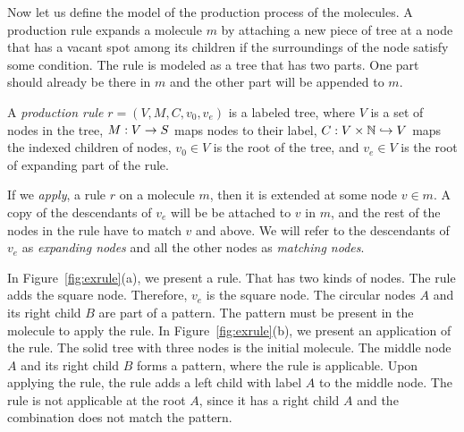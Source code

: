 Now let us define the model of the production process of the molecules.
A production rule expands a molecule $m$ by attaching a new piece of tree at a node that has a vacant spot among its children if the surroundings of the
node satisfy some condition.
The rule is modeled as a tree that has two parts.
One part should already be there in $m$ and the other part will be appended to $m$.

\begin{df}
  A {\em production rule} $r = (V, M, C, v_0, v_e)$ is a labeled tree, where
  $V$ is a set of nodes in the tree,
  $M : V \rightarrow S$ maps nodes to their label, 
  $C : V \times \mathbb{N} \hookrightarrow V$ maps the indexed children of nodes,
  $v_0 \in V$ is the root of the tree, and
  $v_e \in V$ is the root of expanding part of the rule.
\end{df}

If we {\em apply}, a rule $r$ on a molecule $m$, then it is extended at some node
$v \in m$. A copy of the descendants of $v_e$ will be be attached to
$v$ in $m$, and the rest of the nodes in the rule have to match $v$ and above.
We will refer to the descendants of $v_e$ as {\em expanding nodes}
and all the other nodes as {\em matching nodes}.


\begin{example}
  In Figure~\ref{fig:exrule}(a), we present a rule. That has
  two kinds of nodes.
  The rule adds the square node.
  Therefore, $v_e$ is the square node.
  The circular nodes $A$ and its right child $B$ are part of a pattern.
  The pattern must be present in the molecule to apply the rule.
  In Figure~\ref{fig:exrule}(b), we present an application of the rule.
  The solid tree with three nodes is the initial molecule.
  The middle node $A$ and its right child $B$ forms a pattern, where the rule is applicable.
  Upon applying the rule, the rule adds a left child with label $A$ to the middle node.
  The rule is not applicable at the root $A$, since it has a right child $A$
  and the combination does not match the pattern.
\end{example}

